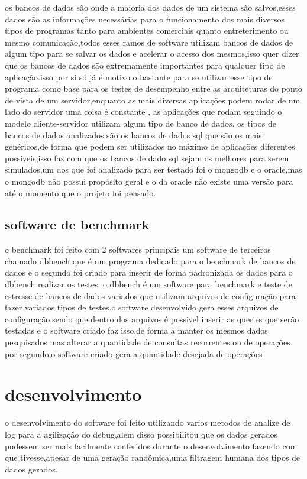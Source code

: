 \documentclass[
	12pt,				%
	openright,			%
	oneside,			%
	a4paper,			%
	english,			%
	french,				%
	spanish,			%
	brazil,				%
	]{abntex2}
\begin{document}
os bancos de dados são onde a maioria dos dados de um sistema são salvos,esses dados são as informações necessárias para o funcionamento dos mais diversos tipos de programas tanto para ambientes comerciais quanto entreterimento ou mesmo comunicação,todos esses ramos de software utilizam bancos de dados de algum tipo para se salvar os dados e acelerar o acesso dos mesmos,isso quer dizer que os bancos de dados são extremamente importantes para qualquer tipo de aplicação.isso por si só já é motivo o bastante para se utilizar esse tipo de programa como base para os testes de desempenho entre as arquiteturas do ponto de vista de um servidor,enquanto as mais diversas aplicações podem rodar de um lado do servidor uma coisa é constante , as aplicações que rodam seguindo o modelo cliente-servidor utilizam algum tipo de banco de dados.\newline
os tipos de bancos de dados analizados são os bancos de dados sql que são os mais genéricos,de forma que podem ser utilizados no máximo de aplicações diferentes possiveis,isso faz com que os bancos de dado sql sejam os melhores para serem simulados,um dos que foi analizado para ser testado foi o mongodb e o oracle,mas o mongodb não possui propósito geral e o da oracle não existe uma versão para  até o momento que o projeto foi pensado.

\section{software de benchmark}
\label{sec: software de benchmark}
o benchmark foi feito com 2 softwares principais um software de terceiros chamado dbbench que é um programa dedicado para o benchmark de bancos de dados e o segundo foi criado para inserir de forma padronizada os dados para o dbbench realizar os testes.
o dbbench é um software para benchmark e teste de estresse de bancos de dados variados que utilizam arquivos de configuração para fazer variados tipos de testes.o software desenvolvido gera esses arquivos de configuração,sendo que dentro dos arquivos é possivel inserir as queries que serão testadas e o software criado faz isso,de forma a manter os mesmos dados pesquisados mas alterar a quantidade de consultas recorrentes ou de operações por segundo,o software criado gera a quantidade desejada de operações 

\chapter{desenvolvimento}
\label{ch: desenvolvimento}
o desenvolvimento do software foi feito utilizando varios metodos de analize de log para a agilização do debug,alem disso possibilitou que os dados gerados pudessem ser mais facilmente conferidos durante o desenvolvimento fazendo com que tivesse,apesar de uma geração randômica,uma filtragem humana dos tipos de dados gerados.\newline
\end{document}
